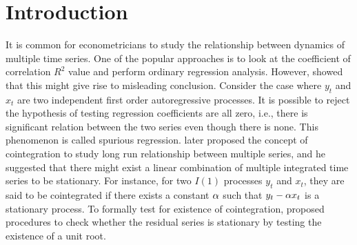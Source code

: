 \chapter{Introduction}
\ifpdf
    \graphicspath{{Introduction/IntroductionFigs/PNG/}{Introduction/IntroductionFigs/PDF/}{Introduction/IntroductionFigs/}}
\else
    \graphicspath{{Introduction/IntroductionFigs/EPS/}{Introduction/IntroductionFigs/}}
\fi

It is common for econometricians to study the relationship between dynamics of multiple time series. One of the popular approaches is to look at the coefficient of correlation $R^2$ value and perform ordinary regression analysis. However, \cite{grangernewbold1974} showed that this might give rise to misleading conclusion. Consider the case where $y_t$ and $x_t$ are two independent first order autoregressive processes. It is possible to reject the hypothesis of testing regression coefficients are all zero, i.e., there is significant relation between the two series even though there is none. This phenomenon is called spurious regression. \cite{granger1986} later proposed the concept of cointegration to study long run relationship between multiple series, and he suggested that there might exist a linear combination of multiple integrated time series to be stationary. For instance, for two $I(1)$ processes $y_t$ and $x_t$, they are said to be cointegrated if there exists a constant $\alpha$ such that $y_t - \alpha x_t$ is a stationary process. To formally test for existence of cointegration, \cite{englegranger1987} proposed procedures to check whether the residual series is stationary by testing the existence of a unit root.

